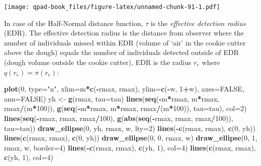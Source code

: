 \documentclass[12pt,]{book}
\newenvironment{Shaded}{\begin{snugshade}}{\end{snugshade}}
\newcommand{\DataTypeTok}[1]{\textcolor[rgb]{0.13,0.29,0.53}{#1}}
\newcommand{\DecValTok}[1]{\textcolor[rgb]{0.00,0.00,0.81}{#1}}
\newcommand{\KeywordTok}[1]{\textcolor[rgb]{0.13,0.29,0.53}{\textbf{#1}}}
\newcommand{\NormalTok}[1]{#1}
\newcommand{\OperatorTok}[1]{\textcolor[rgb]{0.81,0.36,0.00}{\textbf{#1}}}
\newcommand{\OtherTok}[1]{\textcolor[rgb]{0.56,0.35,0.01}{#1}}
\newcommand{\StringTok}[1]{\textcolor[rgb]{0.31,0.60,0.02}{#1}}
\begin{document}
\texttt{[image: qpad-book\_files/figure-latex/unnamed-chunk-91-1.pdf]}

In case of the Half-Normal distance function,
\(\tau\) is the \emph{effective detection radius} (EDR).
The effective detection radius is the distance from observer
where the number of individuals missed within EDR
(volume of `air' in the cookie cutter above the dough)
equals the number of individuals detected outside of EDR
(dough volume outside the cookie cutter),
EDR is the radius \(r_e\) where \(q(r_e)=\pi(r_e)\):

\begin{Shaded}
\begin{Highlighting}[]
\KeywordTok{plot}\NormalTok{(}\DecValTok{0}\NormalTok{, }\DataTypeTok{type=}\StringTok{"n"}\NormalTok{, }\DataTypeTok{xlim=}\NormalTok{m}\OperatorTok{*}\KeywordTok{c}\NormalTok{(}\OperatorTok{-}\NormalTok{rmax, rmax), }\DataTypeTok{ylim=}\KeywordTok{c}\NormalTok{(}\OperatorTok{-}\NormalTok{w, }\DecValTok{1}\OperatorTok{+}\NormalTok{w), }
  \DataTypeTok{axes=}\OtherTok{FALSE}\NormalTok{, }\DataTypeTok{ann=}\OtherTok{FALSE}\NormalTok{)}
\NormalTok{yh <-}\StringTok{ }\KeywordTok{g}\NormalTok{(rmax, }\DataTypeTok{tau=}\NormalTok{tau)}
\KeywordTok{lines}\NormalTok{(}\KeywordTok{seq}\NormalTok{(}\OperatorTok{-}\NormalTok{m}\OperatorTok{*}\NormalTok{rmax, m}\OperatorTok{*}\NormalTok{rmax, rmax}\OperatorTok{/}\NormalTok{(m}\OperatorTok{*}\DecValTok{100}\NormalTok{)),}
  \KeywordTok{g}\NormalTok{(}\KeywordTok{seq}\NormalTok{(}\OperatorTok{-}\NormalTok{m}\OperatorTok{*}\NormalTok{rmax, m}\OperatorTok{*}\NormalTok{rmax, rmax}\OperatorTok{/}\NormalTok{(m}\OperatorTok{*}\DecValTok{100}\NormalTok{)), }\DataTypeTok{tau=}\NormalTok{tau),}
  \DataTypeTok{col=}\DecValTok{2}\NormalTok{)}
\KeywordTok{lines}\NormalTok{(}\KeywordTok{seq}\NormalTok{(}\OperatorTok{-}\NormalTok{rmax, rmax, rmax}\OperatorTok{/}\DecValTok{100}\NormalTok{),}
  \KeywordTok{g}\NormalTok{(}\KeywordTok{abs}\NormalTok{(}\KeywordTok{seq}\NormalTok{(}\OperatorTok{-}\NormalTok{rmax, rmax, rmax}\OperatorTok{/}\DecValTok{100}\NormalTok{)), }\DataTypeTok{tau=}\NormalTok{tau))}
\KeywordTok{draw_ellipse}\NormalTok{(}\DecValTok{0}\NormalTok{, yh, rmax, w, }\DataTypeTok{lty=}\DecValTok{2}\NormalTok{)}
\KeywordTok{lines}\NormalTok{(}\OperatorTok{-}\KeywordTok{c}\NormalTok{(rmax, rmax), }\KeywordTok{c}\NormalTok{(}\DecValTok{0}\NormalTok{, yh))}
\KeywordTok{lines}\NormalTok{(}\KeywordTok{c}\NormalTok{(rmax, rmax), }\KeywordTok{c}\NormalTok{(}\DecValTok{0}\NormalTok{, yh))}
\KeywordTok{draw_ellipse}\NormalTok{(}\DecValTok{0}\NormalTok{, }\DecValTok{0}\NormalTok{, rmax, w)}
\KeywordTok{draw_ellipse}\NormalTok{(}\DecValTok{0}\NormalTok{, }\DecValTok{1}\NormalTok{, rmax, w, }\DataTypeTok{border=}\DecValTok{4}\NormalTok{)}
\KeywordTok{lines}\NormalTok{(}\OperatorTok{-}\KeywordTok{c}\NormalTok{(rmax, rmax), }\KeywordTok{c}\NormalTok{(yh, }\DecValTok{1}\NormalTok{), }\DataTypeTok{col=}\DecValTok{4}\NormalTok{)}
\KeywordTok{lines}\NormalTok{(}\KeywordTok{c}\NormalTok{(rmax, rmax), }\KeywordTok{c}\NormalTok{(yh, }\DecValTok{1}\NormalTok{), }\DataTypeTok{col=}\DecValTok{4}\NormalTok{)}
\end{Highlighting}
\end{Shaded}
\end{document}

